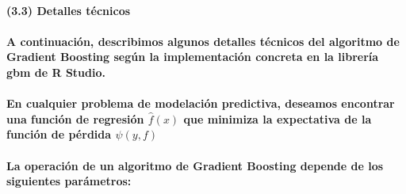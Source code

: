 \documentclass[]{article}
\let\oldparagraph\paragraph
\renewcommand{\paragraph}[1]{\oldparagraph{#1}\mbox{}}
\begin{document}
\paragraph{(3.3) Detalles técnicos}\label{detalles-tecnicos}

\paragraph{\texorpdfstring{A continuación, describimos algunos detalles
técnicos del algoritmo de \textbf{Gradient Boosting} según la
implementación concreta en la librería \textbf{gbm} de R
Studio.}{A continuación, describimos algunos detalles técnicos del algoritmo de Gradient Boosting según la implementación concreta en la librería gbm de R Studio.}}\label{a-continuacion-describimos-algunos-detalles-tecnicos-del-algoritmo-de-gradient-boosting-segun-la-implementacion-concreta-en-la-libreria-gbm-de-r-studio.}

\paragraph{\texorpdfstring{En cualquier problema de modelación
predictiva, deseamos encontrar una función de regresión \(\hat{f}(x)\)
que minimiza la expectativa de la función de pérdida
\(\psi(y, f)\)}{En cualquier problema de modelación predictiva, deseamos encontrar una función de regresión \textbackslash{}hat\{f\}(x) que minimiza la expectativa de la función de pérdida \textbackslash{}psi(y, f)}}\label{en-cualquier-problema-de-modelacion-predictiva-deseamos-encontrar-una-funcion-de-regresion-hatfx-que-minimiza-la-expectativa-de-la-funcion-de-perdida-psiy-f}

\paragraph{La operación de un algoritmo de Gradient Boosting depende de
los siguientes
parámetros:}\label{la-operacion-de-un-algoritmo-de-gradient-boosting-depende-de-los-siguientes-parametros}
\end{document}
